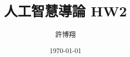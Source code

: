 \setlength{\parindent}{0pt}

\title{人工智慧導論 HW2}
\author{許博翔}
\date{\today}
\maketitle
\thispagestyle{empty}
\setcounter{page}{1}
\pagestyle{fancy}

\renewcommand{\sectionmark}[1]{\markright{#1}}
\renewcommand{\subsectionmark}[1]{}

\lhead{\thetitle}
\chead{}
\rhead{}
\cfoot{}
\rfoot{\thepage}
\renewcommand{\headrulewidth}{0.4pt}
\renewcommand{\footrulewidth}{0.4pt}








\newpage
